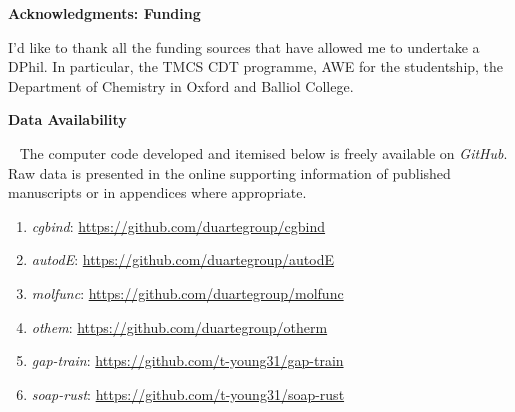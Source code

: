 \documentclass[main.tex]{subfiles}
\begin{document}
	\newpage
	\begin{center}
		{\bfseries\Large \textsf{Acknowledgments: Funding}}
	\end{center}
	I'd like to thank all the funding sources that have allowed me to undertake a DPhil. In particular, the TMCS CDT programme, AWE for the studentship, the Department of Chemistry in Oxford and Balliol College.
		
	\newpage
	
	\newpage
	\begin{center}
		{\bfseries\Large \textsf{Data Availability}}
	\end{center}
	~
	The computer code developed and itemised below is freely available on \emph{GitHub}. Raw data is presented in the online supporting information of published manuscripts or in  appendices where appropriate.
	
	\begin{enumerate}[label=\roman*., itemsep=1.5ex]
		\item \emph{cgbind}: {\url{https://github.com/duartegroup/cgbind}}
		\item \emph{autodE}: {\url{https://github.com/duartegroup/autodE}}
		\item \emph{molfunc}: {\url{https://github.com/duartegroup/molfunc}}
		\item \emph{othem}: {\url{https://github.com/duartegroup/otherm}}
		\item \emph{gap-train}: {\url{https://github.com/t-young31/gap-train}}
		\item \emph{soap-rust}: {\url{https://github.com/t-young31/soap-rust}}
	\end{enumerate}
	
	
	\newpage


	
\end{document}

